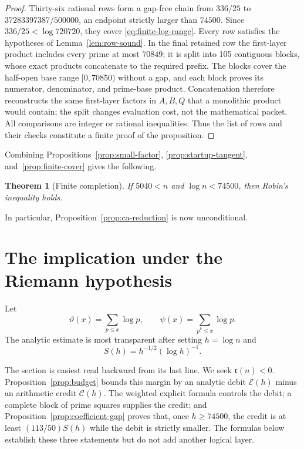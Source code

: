 \documentclass[11pt]{amsart}
\newtheorem{theorem}{Theorem}[section]
\theoremstyle{definition}
\theoremstyle{remark}
\numberwithin{equation}{section}
\newcommand{\M}{\mathfrak r}
\newcommand{\E}{\mathcal{E}}
\newcommand{\Pcost}{\mathcal{C}}
\begin{document}
\begin{proof}
Thirty-six rational rows form a gap-free chain from $336/25$ to
$37283397387/500000$, an endpoint strictly larger than $74500$.  Since
$336/25<\log720720$, they cover \eqref{eq:finite-log-range}.  Every row
satisfies the hypotheses of Lemma~\ref{lem:row-sound}.  In the final retained
row the first-layer product includes every prime at most $70849$; it is split
into 105 contiguous blocks, whose exact products concatenate to the required
prefix.  The blocks cover the half-open base range $[0,70850)$ without a gap,
and each block proves its numerator, denominator, and prime-base product.
Concatenation therefore reconstructs the same first-layer factors in $A,B,Q$
that a monolithic product would contain; the split changes evaluation cost,
not the mathematical packet.
All comparisons are integer or rational inequalities.  Thus the list of rows
and their checks constitute a finite proof of the proposition.
\end{proof}

Combining Propositions~\ref{prop:small-factor},
\ref{prop:startup-tangent}, and~\ref{prop:finite-cover} gives the following.

\begin{theorem}[Finite completion]\label{thm:finite}
If $5040<n$ and $\log n<74500$, then Robin's inequality holds.
\end{theorem}

In particular, Proposition~\ref{prop:ca-reduction} is now unconditional.

\section{The implication under the Riemann hypothesis}
\label{sec:rh-forward}

Let
\[
  \vartheta(x)=\sum_{p\le x}\log p,
  \qquad
  \psi(x)=\sum_{p^k\le x}\log p.
\]
The analytic estimate is most transparent after setting $h=\log n$ and
\begin{equation}\label{eq:natural-scale}
  S(h)=h^{-1/2}(\log h)^{-1}.
\end{equation}

The section is easiest read backward from its last line.  We seek
$\M(n)<0$.  Proposition~\ref{prop:budget} bounds this margin by an analytic
debit $\E(h)$ minus an arithmetic credit $\Pcost(h)$.  The weighted explicit
formula controls the debit; a complete block of prime squares supplies the
credit; and Proposition~\ref{prop:coefficient-gap} proves that, once
$h\ge74500$, the credit is at least $(113/50)S(h)$ while the debit is
strictly smaller.  The formulas below establish these three statements but
do not add another logical layer.
\end{document}
